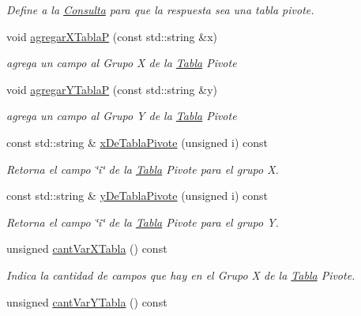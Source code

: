 \begin{DoxyCompactItemize}
\begin{DoxyCompactList}\small\item\em \-Define a la \hyperlink{classConsulta}{\-Consulta} para que la respuesta sea una tabla pivote. \end{DoxyCompactList}\item 
void \hyperlink{classConsulta_aae2c5422470a3471eb7a85938ec6dfe1}{agregar\-X\-Tabla\-P} (const std\-::string \&x)
\begin{DoxyCompactList}\small\item\em agrega un campo al \-Grupo \-X de la \hyperlink{classTabla}{\-Tabla} \-Pivote \end{DoxyCompactList}\item 
void \hyperlink{classConsulta_ab31d73a9ad0c0b3ef5fdc39f8cefe275}{agregar\-Y\-Tabla\-P} (const std\-::string \&y)
\begin{DoxyCompactList}\small\item\em agrega un campo al \-Grupo \-Y de la \hyperlink{classTabla}{\-Tabla} \-Pivote \end{DoxyCompactList}\item 
const std\-::string \& \hyperlink{classConsulta_ab1c28cbebea96855890deaeb156b4777}{x\-De\-Tabla\-Pivote} (unsigned i) const 
\begin{DoxyCompactList}\small\item\em \-Retorna el campo \char`\"{}i\char`\"{} de la \hyperlink{classTabla}{\-Tabla} \-Pivote para el grupo \-X. \end{DoxyCompactList}\item 
const std\-::string \& \hyperlink{classConsulta_a3c42bada58e3474e622dae3951530d82}{y\-De\-Tabla\-Pivote} (unsigned i) const 
\begin{DoxyCompactList}\small\item\em \-Retorna el campo \char`\"{}i\char`\"{} de la \hyperlink{classTabla}{\-Tabla} \-Pivote para el grupo \-Y. \end{DoxyCompactList}\item 
unsigned \hyperlink{classConsulta_a45ef5db7d7d017fb4f3dcded13bee6a2}{cant\-Var\-X\-Tabla} () const 
\begin{DoxyCompactList}\small\item\em \-Indica la cantidad de campos que hay en el \-Grupo \-X de la \hyperlink{classTabla}{\-Tabla} \-Pivote. \end{DoxyCompactList}\item 
unsigned \hyperlink{classConsulta_aeeadf61eb1a51cb8b750950724b3725b}{cant\-Var\-Y\-Tabla} () const 

\end{DoxyCompactItemize}
